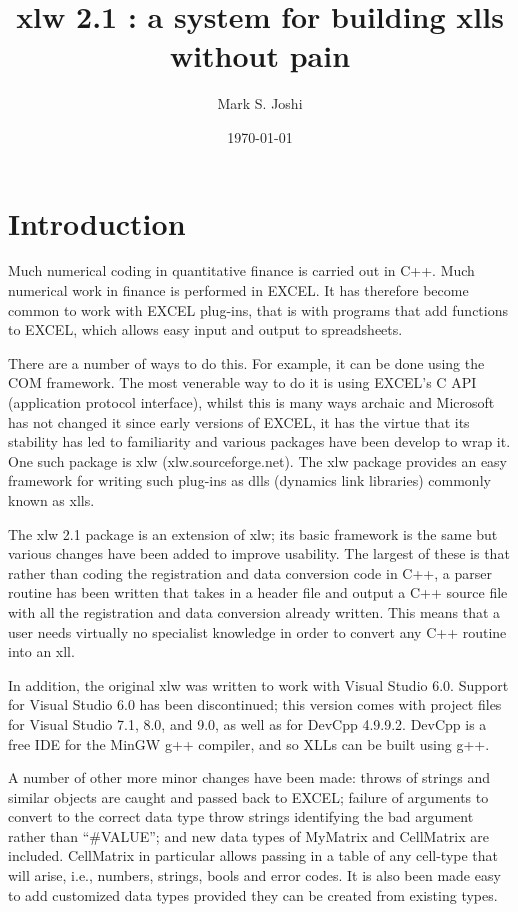\documentclass[12pt,reqno]{amsart}
\title[xlw 2,1]{
xlw 2.1 : a system for building xlls without pain
}
\author{Mark S. Joshi}
\date {\today}
\numberwithin{equation}{section}
\numberwithin{figure}{section}
\begin{document}
\maketitle
\section{Introduction}
Much numerical coding in quantitative finance is carried out in
C++. Much numerical work in finance is performed in EXCEL. It has
therefore become common to work with EXCEL plug-ins, that is with
programs that add functions to EXCEL, which allows easy input and output
to spreadsheets.

There are a number of ways to do this. For example, it can be done
using the COM framework. The most venerable way to do it is using
EXCEL's C API (application protocol interface), whilst this is many
ways archaic and Microsoft has not changed it since early versions of
EXCEL, it has the virtue that its stability has led to familiarity and
various packages have been develop to wrap it. One such package is xlw
(xlw.sourceforge.net). The xlw package provides an easy framework for
writing such plug-ins as dlls (dynamics link libraries) commonly known
as xlls. 

The xlw 2.1 package is an extension of xlw; its basic framework is the same but
various changes have been added to improve usability. The largest of these is
that rather than coding the registration and data conversion code in C++, a
parser routine has been written that takes in a header file and output a C++
source file with all the registration and data conversion already written. This
means that a user needs virtually no specialist knowledge in order to convert
any C++ routine into an xll.  

In addition, the original xlw was written to work with Visual Studio 6.0.
Support for Visual Studio 6.0 has been discontinued; this version comes with
project files for Visual Studio 7.1, 8.0, and 9.0, as well as for DevCpp
4.9.9.2.  DevCpp is a free IDE for the MinGW g++ compiler, and so XLLs can be
built using g++. 

A number of other more minor changes have been made: throws of strings and
similar objects are caught and passed back to EXCEL; failure of
arguments to convert to the correct data type throw strings
identifying the bad argument rather than ``\#VALUE''; and new data
types of MyMatrix and CellMatrix are included. CellMatrix in
particular allows passing in a table of any cell-type that will arise,
i.e., numbers, strings, bools and error codes. It is also been made
easy to add customized data types provided they can be created from
existing types. 
\end{document}
